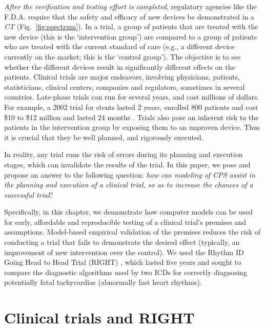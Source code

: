 \emph{After the verification and testing effort is completed}, regulatory agencies like the F.D.A. require that the safety and efficacy of new devices be demonstrated in a \emph{CT} (Fig.~\ref{fig:spectrum}).
In a trial, a group of patients that are treated with the new device (this is the `intervention group') are compared to a group of patients who are treated with the current standard of care (e.g., a different device currently on the market; this is the `control group').
The objective is to see whether the different devices result in significantly different effects on the patients.
Clinical trials are major endeavors, involving physicians, patients, statisticians, clinical centers, companies and regulators, sometimes in several countries.
Late-phase trials can run for several years, and cost millions of dollars.
For example, a 2002 trial for stents lasted 2 years, enrolled 800 patients and cost \$10 to \$12 million and lasted 24 months \cite{Kaplan04_Cost}.
Trials also pose an inherent risk to the patients in the intervention group by exposing them to an unproven device.
Thus it is crucial that they be well planned, and rigorously executed.

In reality, any trial runs the risk of errors during its planning and execution stages, which can invalidate the results of the trial.
In this paper, we pose and propose an answer to the following question: \emph{how can modeling of CPS assist in the planning and execution of a clinical trial, so as to increase the chances of a successful trial}?

Specifically, in this chapter,
we demonstrate how  computer models can be used for early, affordable and reproducible testing of a clinical trial's premises and assumptions.
Model-based empirical validation of the premises reduces the risk of conducting a trial that fails to demonstrate the desired effect (typically, an improvement of new intervention over the control). 
We used the Rhythm ID Going Head to Head Trial (RIGHT) \cite{GoldABBTB11_RIGHTresults}, which lasted five years and sought to compare the diagnostic algorithms used by two ICDs for correctly diagnosing potentially fatal tachycardias (abnormally fast heart rhythms).
\section{Clinical trials and RIGHT}
\label{sec:rcts}

